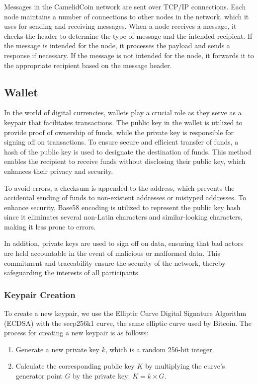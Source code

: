 \documentclass{article}
\begin{document}
Messages in the CamelidCoin network are sent over TCP/IP connections.
Each node maintains a number of connections to other nodes in the network, which it uses for sending and receiving messages.
When a node receives a message, it checks the header to determine the type of message and the intended recipient.
If the message is intended for the node, it processes the payload and sends a response if necessary.
If the message is not intended for the node, it forwards it to the appropriate recipient based on the message header.
\subsection{Wallet}
In the world of digital currencies, wallets play a crucial role as they serve as a keypair that facilitates transactions. 
The public key in the wallet is utilized to provide proof of ownership of funds, while the private key is responsible for signing off on transactions. 
To ensure secure and efficient transfer of funds, a hash of the public key is used to designate the destination of funds. 
This method enables the recipient to receive funds without disclosing their public key, which enhances their privacy and security.

To avoid errors, a checksum is appended to the address, which prevents the accidental sending of funds to non-existent addresses or mistyped addresses. 
To enhance security, Base58 encoding is utilized to represent the public key hash since it eliminates several non-Latin characters and similar-looking characters, making it less prone to errors.

In addition, private keys are used to sign off on data, ensuring that bad actors are held accountable in the event of malicious or malformed data. 
This commitment and traceability ensure the security of the network, thereby safeguarding the interests of all participants.
\subsubsection{Keypair Creation}
To create a new keypair, we use the Elliptic Curve Digital Signature Algorithm (ECDSA) with the secp256k1 curve, the same elliptic curve used by Bitcoin. 
The process for creating a new keypair is as follows:

\begin{enumerate}
\item Generate a new private key $k$, which is a random 256-bit integer.
\item Calculate the corresponding public key $K$ by multiplying the curve's generator point $G$ by the private key: $K = k \times G$.
\end{enumerate}
\end{document}
